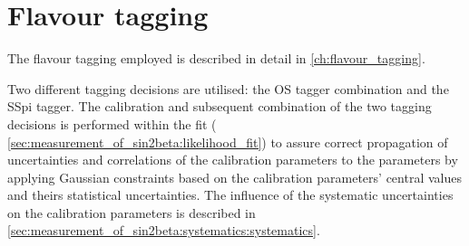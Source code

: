 
\section{Flavour tagging}
\label{sec:measurement_of_sin2beta:flavour_tagging}

The flavour tagging employed is described in detail in
\cref{ch:flavour_tagging}.

Two different tagging decisions are utilised: the \acf{OS} tagger combination
and the \acf{SSpi} tagger. The calibration and subsequent combination of the two
tagging decisions is performed within the fit (\cf
\cref{sec:measurement_of_sin2beta:likelihood_fit}) to assure correct propagation
of uncertainties and correlations of the calibration parameters to the \CP
parameters by applying Gaussian constraints based on the calibration parameters'
central values and theirs statistical uncertainties. The influence of the
systematic uncertainties on the calibration parameters is described in
\cref{sec:measurement_of_sin2beta:systematics:systematics}.
